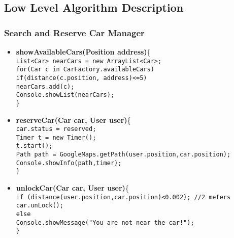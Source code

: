 \subsection{Low Level Algorithm Description}
\subsubsection{Search and Reserve Car Manager}
\begin{itemize}
\item \textbf{showAvailableCars(Position address)}\{\\
\texttt{List<Car> nearCars = new ArrayList<Car>; \\
for(Car c in CarFactory.availableCars)\\
\tab if(distance(c.position, address)<=5)\\
\tab \tab nearCars.add(c);\\
Console.showList(nearCars);\\
\}\\
}



\item \textbf{reserveCar(Car car, User user)}\{\\
\texttt{car.status = reserved;\\
Timer t = new Timer();\\
t.start();\\
Path path = GoogleMaps.getPath(user.position,car.position);\\
Console.showInfo(path,timer);\\
\}\\
}
\item \textbf {unlockCar(Car car, User user)}\{\\
\texttt{if (distance(user.position,car.position)<0.002); //2 meters\\
\tab car.unLock();\\
else \\
\tab Console.showMessage("You are not near the car!");\\
\}\\
}
\end{itemize}


